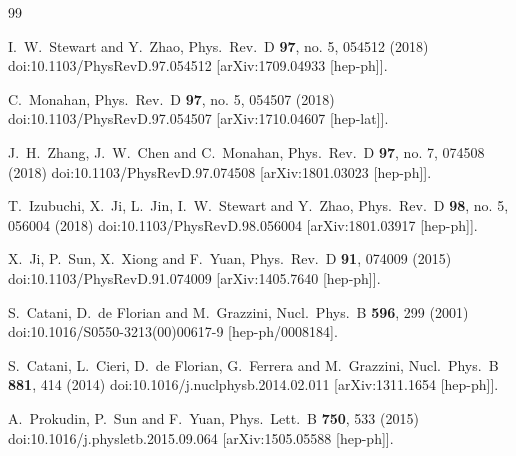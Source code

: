\documentclass[aps,prd,preprint,tightenlines,superscriptaddress,nofootinbib]{revtex4}
\begin{document}
\begin{thebibliography}{99}
  
  I.~W.~Stewart and Y.~Zhao,
  Phys.\ Rev.\ D {\bf 97}, no. 5, 054512 (2018)
  doi:10.1103/PhysRevD.97.054512
  [arXiv:1709.04933 [hep-ph]].
  
  C.~Monahan,
  Phys.\ Rev.\ D {\bf 97}, no. 5, 054507 (2018)
  doi:10.1103/PhysRevD.97.054507
  [arXiv:1710.04607 [hep-lat]].

  J.~H.~Zhang, J.~W.~Chen and C.~Monahan,
  Phys.\ Rev.\ D {\bf 97}, no. 7, 074508 (2018)
  doi:10.1103/PhysRevD.97.074508
  [arXiv:1801.03023 [hep-ph]].



  T.~Izubuchi, X.~Ji, L.~Jin, I.~W.~Stewart and Y.~Zhao,
  Phys.\ Rev.\ D {\bf 98}, no. 5, 056004 (2018)
  doi:10.1103/PhysRevD.98.056004
  [arXiv:1801.03917 [hep-ph]].

  
  X.~Ji, P.~Sun, X.~Xiong and F.~Yuan,
  Phys.\ Rev.\ D {\bf 91}, 074009 (2015)
  doi:10.1103/PhysRevD.91.074009
  [arXiv:1405.7640 [hep-ph]].

  S.~Catani, D.~de Florian and M.~Grazzini,
  Nucl.\ Phys.\ B {\bf 596}, 299 (2001)
  doi:10.1016/S0550-3213(00)00617-9
  [hep-ph/0008184].
  
  S.~Catani, L.~Cieri, D.~de Florian, G.~Ferrera and M.~Grazzini,
  Nucl.\ Phys.\ B {\bf 881}, 414 (2014)
  doi:10.1016/j.nuclphysb.2014.02.011
  [arXiv:1311.1654 [hep-ph]].

  A.~Prokudin, P.~Sun and F.~Yuan,
  Phys.\ Lett.\ B {\bf 750}, 533 (2015)
  doi:10.1016/j.physletb.2015.09.064
  [arXiv:1505.05588 [hep-ph]].


   
\end{thebibliography}
\end{document}

